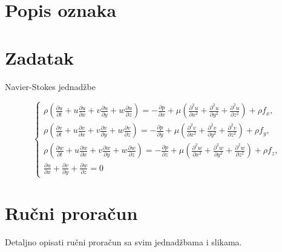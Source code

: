 \documentclass[a4paper,12pt]{article}
\begin{document}
\newpage
\listoftables
{}

\newpage
\section*{Popis oznaka}

\newpage
{}

\section{Zadatak}
Navier-Stokes jednadžbe

\begin{equation}
\begin{cases}
\rho \left( \frac{\partial u}{\partial t} + u \frac{\partial u}{\partial x} + v \frac{\partial u}{\partial y} + w \frac{\partial u}{\partial z} \right) = - \frac{\partial p}{\partial x} + \mu \left( \frac{\partial^2 u}{\partial x^2} + \frac{\partial^2 u}{\partial y^2} + \frac{\partial^2 u}{\partial z^2} \right) + \rho f_x, \\[1em]
\rho \left( \frac{\partial v}{\partial t} + u \frac{\partial v}{\partial x} + v \frac{\partial v}{\partial y} + w \frac{\partial v}{\partial z} \right) = - \frac{\partial p}{\partial y} + \mu \left( \frac{\partial^2 v}{\partial x^2} + \frac{\partial^2 v}{\partial y^2} + \frac{\partial^2 v}{\partial z^2} \right) + \rho f_y, \\[1em]
\rho \left( \frac{\partial w}{\partial t} + u \frac{\partial w}{\partial x} + v \frac{\partial w}{\partial y} + w \frac{\partial w}{\partial z} \right) = - \frac{\partial p}{\partial z} + \mu \left( \frac{\partial^2 w}{\partial x^2} + \frac{\partial^2 w}{\partial y^2} + \frac{\partial^2 w}{\partial z^2} \right) + \rho f_z, \\[0.5em]
\frac{\partial u}{\partial x} + \frac{\partial v}{\partial y} + \frac{\partial w}{\partial z} = 0
\end{cases}
\end{equation}


\section{Ručni proračun}
Detaljno opisati ručni proračun sa svim jednadžbama i slikama.
\end{document}
